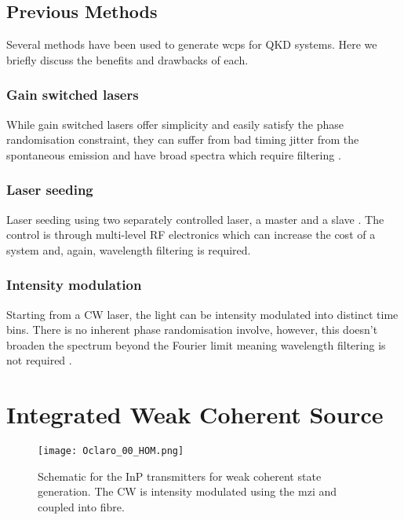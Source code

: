 \subsection{Previous Methods}

Several methods have been used to generate \acp{wcp} for \ac{QKD} systems. Here we briefly discuss the benefits and drawbacks of each.

\subsubsection*{Gain switched lasers}

While gain switched lasers offer simplicity and easily satisfy the phase randomisation constraint, they can suffer from bad timing jitter from the spontaneous emission and have broad spectra which require filtering \cite{Agnesi2019}.


\subsubsection*{Laser seeding}

Laser seeding using two separately controlled laser, a master and a slave \cite{Comandar2016PLS}. The control is through multi-level RF electronics which can increase the cost of a system and, again, wavelength filtering is required.


\subsubsection*{Intensity modulation}

Starting from a \ac{CW} laser, the light can be intensity modulated into distinct time bins. There is no inherent phase randomisation involve, however, this doesn't broaden the spectrum beyond the Fourier limit meaning wavelength filtering is not required \cite{Sibson2017InP}.

\section{Integrated Weak Coherent Source}

\begin{figure}[tp]
	\centering
	\texttt{[image: Oclaro\_00\_HOM.png]}
	\caption[Schematic of the integrated transmitters for weak coherent state generation]{Schematic for the \ac{InP} transmitters for weak coherent state generation. The \ac{CW} is intensity modulated using the \ac{mzi} and coupled into fibre.}
	\label{fig:hom_chip}
\end{figure}

